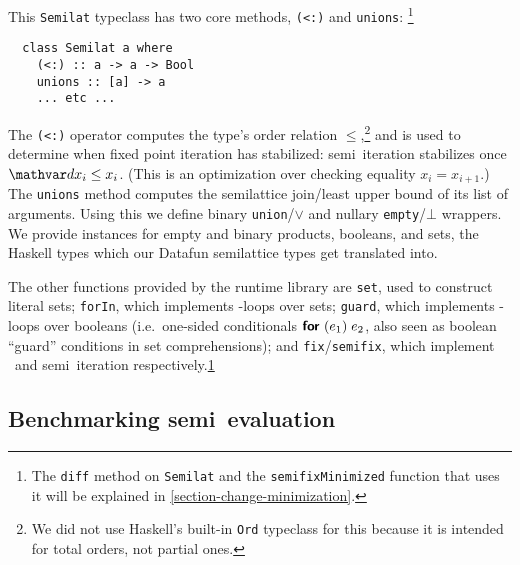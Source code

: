 \label{section-runtime}

This \lstinline{Semilat} typeclass has two core methods, \lstinline{(<:)} and \lstinline{unions}:%
%
\footnote{The \lstinline{diff} method on \lstinline{Semilat} and the \lstinline{semifixMinimized} function that uses it will be explained in \cref{section-change-minimization}.\label{footnote-diff}}

\begin{lstlisting}
  class Semilat a where
    (<:) :: a -> a -> Bool
    unions :: [a] -> a
    ... etc ...
\end{lstlisting}

\noindent
The \lstinline{(<:)} operator computes the type's order relation $\le$,\footnote{We did not use Haskell's built-in \lstinline{Ord} typeclass for this because it is intended for total orders, not partial ones.} and is used to determine when fixed point iteration has stabilized: semi\naive\ iteration stabilizes once $\dx_i \le x_i$.
%
(This is an optimization over checking equality $x_i = x_{i+1}$.)
%
The \lstinline{unions} method computes the semilattice join/least upper bound of its list of arguments.
%
Using this we define binary \lstinline{union}/$\vee$ and nullary \lstinline{empty}/$\bot$ wrappers.
%
We provide instances for empty and binary products, booleans, and sets, the Haskell types which our Datafun semilattice types get translated into.

The other functions provided by the runtime library are \lstinline{set}, used to construct literal sets; \lstinline{forIn}, which implements -loops over sets; \lstinline{guard}, which implements -loops over booleans (i.e.\ one-sided conditionals $\efor{e_1} e_2$, also seen as boolean ``guard'' conditions in set comprehensions); and \lstinline{fix}/\lstinline{semifix}, which implement \naive\ and semi\naive\ iteration respectively.\cref{footnote-diff}





\subsection{Benchmarking semi\naive\ evaluation}\label{section-benchmarks}


